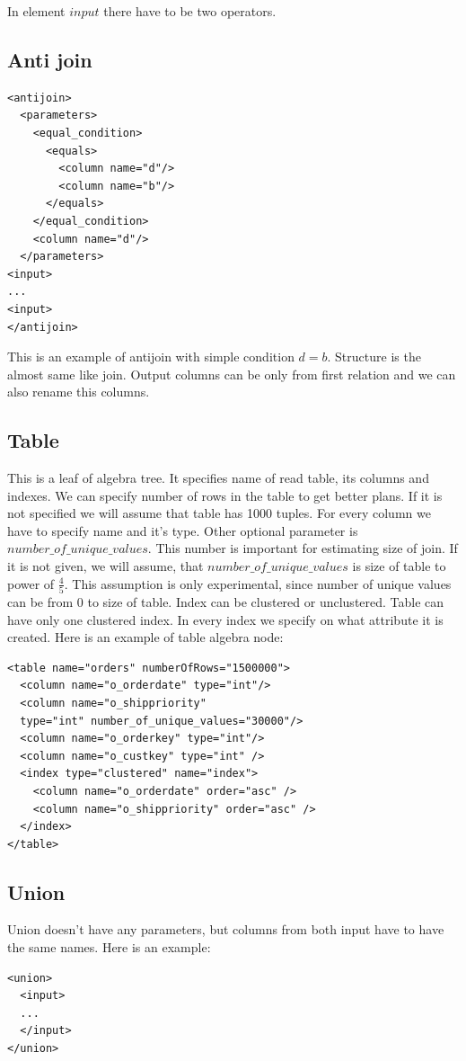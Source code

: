 In element $input$ there have to be two operators.

\subsection{Anti join}

\begin{lstlisting}
<antijoin>
  <parameters>
    <equal_condition>
      <equals>
        <column name="d"/>
        <column name="b"/>
      </equals>
    </equal_condition>
    <column name="d"/>
  </parameters>
<input>
...
<input>
</antijoin>
\end{lstlisting}
This is an example of antijoin with simple condition $d=b$. Structure is the almost same like join. Output columns can be only from first relation and we can also rename this columns.

\subsection{Table}
This is a leaf of algebra tree. It specifies name of read table, its columns and indexes. We can specify number of rows in the table to get better plans. If it is not specified we will assume that table has 1000 tuples. For every column we have to specify name and it's type. Other optional parameter is $number\_of\_unique\_values$. This number is important for estimating size of join. If it is not given, we will assume, that $number\_of\_unique\_values$ is size of table to power of $\frac{4}{5}$. This assumption is only experimental, since number of unique values can be from $0$ to size of table. Index can be clustered or unclustered. Table can have only one clustered index. In every index we specify on what attribute it is created. Here is an example of table algebra node:
 
\begin{lstlisting}
<table name="orders" numberOfRows="1500000">
  <column name="o_orderdate" type="int"/>
  <column name="o_shippriority" 
  type="int" number_of_unique_values="30000"/>
  <column name="o_orderkey" type="int"/>
  <column name="o_custkey" type="int" />
  <index type="clustered" name="index">
    <column name="o_orderdate" order="asc" />
    <column name="o_shippriority" order="asc" />
  </index>
</table>
\end{lstlisting}

\subsection{Union}
Union doesn't have any parameters, but columns from both input have to have the same names. Here is an example:
\begin{lstlisting}
<union>
  <input>
  ...
  </input>
</union>
\end{lstlisting}


